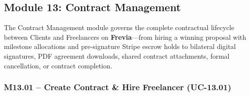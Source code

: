 
\newpage
\subsection{Module 13: Contract Management}

The Contract Management module governs the complete contractual lifecycle between Clients and Freelancers on \textbf{Frevia}---from hiring a winning proposal with milestone allocations and pre-signature Stripe escrow holds to bilateral digital signatures, PDF agreement downloads, shared contract attachments, formal cancellation, or contract completion.

\subsubsection[M13.01 -- Create Contract (UC-13.01)]{M13.01 -- Create Contract \& Hire Freelancer (UC-13.01)}


